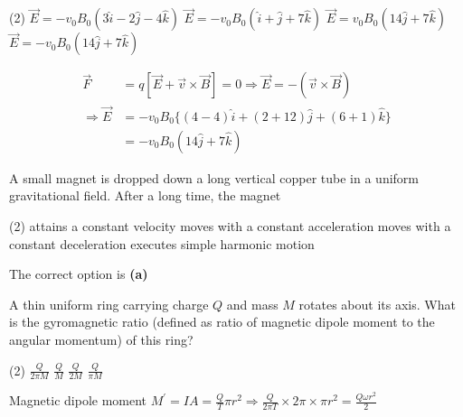 \begin{enumerate}
\begin{minipage}{\textwidth}
	\end{minipage}
	\begin{tasks}(2)
		\task[\textbf{A.}] $\vec{E}=-v_{0} B_{0}(3 \hat{i}-2 \hat{j}-4 \hat{k})$
		\task[\textbf{B.}]$\vec{E}=-v_{0} B_{0}(\hat{i}+\hat{j}+7 \hat{k})$
		\task[\textbf{C.}]$\vec{E}=v_{0} B_{0}(14 \hat{j}+7 \hat{k})$
		\task[\textbf{D.}]$\vec{E}=-v_{0} B_{0}(14 \hat{j}+7 \hat{k})$
	\end{tasks}
	\begin{answer}
		 \begin{align*}
		\vec{F} &=q[\vec{E}+\vec{v} \times \vec{B}]=0 \Rightarrow \vec{E}=-(\vec{v} \times \vec{B}) \\
		\Rightarrow \vec{E} &=-v_{0} B_{0}\{(4-4) \hat{i}+(2+12) \hat{j}+(6+1) \hat{k}\}\\
		&=-v_{0} B_{0}(14 \hat{j}+7 \hat{k})
		\end{align*}
	\end{answer}
	\begin{minipage}{\textwidth}
		\item A small magnet is dropped down a long vertical copper tube in a uniform gravitational field. After a long time, the magnet
	\end{minipage}
	\begin{tasks}(2)
		\task[\textbf{A.}] attains a constant velocity
		\task[\textbf{B.}] moves with a constant acceleration
		\task[\textbf{C.}] moves with a constant deceleration
		\task[\textbf{D.}]executes simple harmonic motion
	\end{tasks}
	\begin{answer}
		The correct option is \textbf{(a)}
	\end{answer}
	\begin{minipage}{\textwidth}
		\item A thin uniform ring carrying charge $Q$ and mass $M$ rotates about its axis. What is the gyromagnetic ratio (defined as ratio of magnetic dipole moment to the angular momentum) of this ring?
	\end{minipage}
	\begin{tasks}(2)
		\task[\textbf{A.}] $\frac{Q}{2 \pi M}$
		\task[\textbf{B.}]$\frac{Q}{M}$
		\task[\textbf{C.}]$\frac{Q}{2 M}$
		\task[\textbf{D.}]$\frac{Q}{\pi M}$
	\end{tasks}
	\begin{answer}
		Magnetic dipole moment $M^{\prime}=I A=\frac{Q}{T} \pi r^{2} \Rightarrow \frac{Q}{2 \pi T} \times 2 \pi \times \pi r^{2}=\frac{Q \omega r^{2}}{2}$\\

\end{answer}
\end{enumerate}
